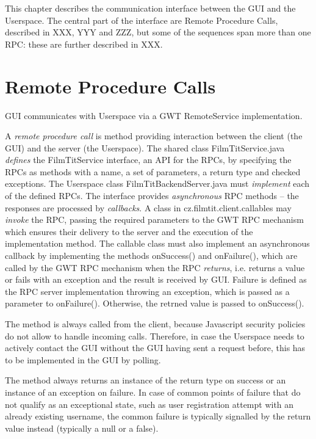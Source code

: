 \label{chap:communication}
\label{sec:communication}

This chapter describes the communication interface between the GUI and the Userspace. The central part of the interface are Remote Procedure Calls, described in XXX, YYY and ZZZ, but some of the sequences span more than one RPC: these are further described in XXX.

\section{Remote Procedure Calls}

GUI communicates with Userspace via a GWT RemoteService implementation.

A \emph{remote procedure call} is method providing interaction between the client (the GUI) and the server (the Userspace). The shared class FilmTitService.java \emph{defines} the FilmTitService interface, an API for the RPCs, by specifying the RPCs as methods with a name, a set of parameters, a return type and checked exceptions. The Userspace class FilmTitBackendServer.java must \emph{implement} each of the defined RPCs. The interface provides \emph{asynchronous} RPC methods -- the responses are processed by \emph{callbacks}. A class in cz.filmtit.client.callables may \emph{invoke} the RPC, passing the required parameters to the GWT RPC mechanism which ensures their delivery to the server and the execution of the implementation method. The callable class must also implement an asynchronous callback by implementing the methods onSuccess() and onFailure(), which are called by the GWT RPC mechanism when the RPC \emph{returns}, i.e. returns a value or fails with an exception and the result is received by GUI. Failure is defined as the RPC server implementation throwing an exception, which is passed as a parameter to onFailure(). Otherwise, the retrned value is passed to onSuccess().

The method is always called from the client, because Javascript security policies do not allow to handle incoming calls.
Therefore, in case the Userspace needs to actively contact the GUI without the GUI having sent a request before,
this has to be implemented in the GUI by polling.

The method always returns an instance of the return type on success or an instance of an exception on failure.
In case of common points of failure that do not qualify as an exceptional state, such as user registration attempt with an already existing username, the common failure is typically signalled by the return value instead (typically a null or a false).

